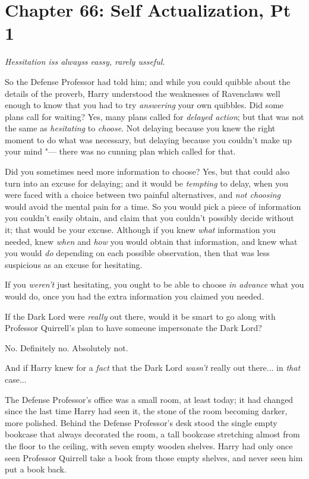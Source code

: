 \chapter{Chapter 66: Self Actualization, Pt 1}
\emph{Hessitation iss alwayss eassy, rarely usseful.}

So the Defense Professor had told him; and while you could quibble about
the details of the proverb, Harry understood the weaknesses of
Ravenclaws well enough to know that you had to try \emph{answering} your
own quibbles. Did some plans call for waiting? Yes, many plans called
for \emph{delayed action}; but that was not the same as
\emph{hesitating} to \emph{choose}. Not delaying because you knew the
right moment to do what was necessary, but delaying because you couldn't
make up your mind "--- there was no cunning plan which called for that.

Did you sometimes need more information to choose? Yes, but that could
also turn into an excuse for delaying; and it would be \emph{tempting}
to delay, when you were faced with a choice between two painful
alternatives, and \emph{not choosing} would avoid the mental pain for a
time. So you would pick a piece of information you couldn't easily
obtain, and claim that you couldn't possibly decide without it; that
would be your excuse. Although if you knew \emph{what} information you
needed, knew \emph{when} and \emph{how} you would obtain that
information, and knew what you would \emph{do} depending on each
possible observation, then that was less suspicious as an excuse for
hesitating.

If you \emph{weren't} just hesitating, you ought to be able to choose
\emph{in advance} what you would do, once you had the extra information
you claimed you needed.

If the Dark Lord were \emph{really} out there, would it be smart to go
along with Professor Quirrell's plan to have someone impersonate the
Dark Lord?

No. Definitely no. Absolutely not.

And if Harry knew for a \emph{fact} that the Dark Lord \emph{wasn't}
really out there... in \emph{that} case...

The Defense Professor's office was a small room, at least today; it had
changed since the last time Harry had seen it, the stone of the room
becoming darker, more polished. Behind the Defense Professor's desk
stood the single empty bookcase that always decorated the room, a tall
bookcase stretching almost from the floor to the ceiling, with seven
empty wooden shelves. Harry had only once seen Professor Quirrell take a
book from those empty shelves, and never seen him put a book back.

